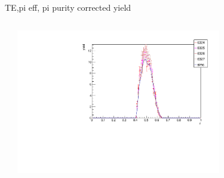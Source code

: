 \begin{frame}{TE,pi eff, pi purity corrected yield}
\begin{columns}
\begin{column}[T]{0.5\textwidth}
\end{column}
\begin{column}[T]{0.5\textwidth}
\includegraphics[width = 0.7\textwidth]{results/yield/check/yieldcheck_210_pos.pdf}
\end{column}
\end{columns}
\end{frame}
